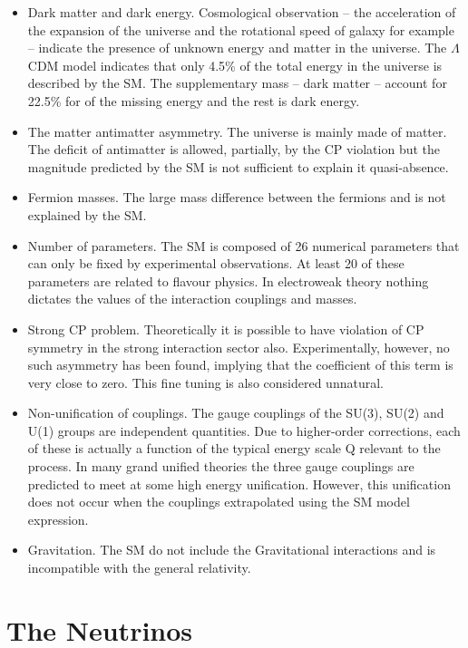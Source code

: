 \begin{itemize}
  \item Dark matter and dark energy. Cosmological observation -- the acceleration of the expansion of the universe and the rotational speed of galaxy for example -- indicate the presence of unknown energy and matter in the universe. The $\Lambda$CDM model \cite{bull_beyond_2016, perivolaropoulos_challenges_2022} indicates that only 4.5\% of the total energy in the universe is described by the SM. The supplementary mass -- dark matter -- account for 22.5\% for of the missing energy and the rest is dark energy.
  \item The matter antimatter asymmetry. The universe is mainly made of matter. The deficit of antimatter is allowed, partially, by the CP violation but the magnitude predicted by the SM is not sufficient to explain it quasi-absence.
  \item Fermion masses. The large mass difference between the fermions and is not explained by the SM.
  \item Number of parameters. The SM is composed of 26 numerical parameters that can only be fixed by experimental observations. At least 20 of these parameters are related to flavour physics. In electroweak theory nothing dictates the values of the interaction couplings and masses.
  \item Strong CP problem. Theoretically it is possible to have violation of CP symmetry in the strong interaction sector also. Experimentally, however, no such asymmetry has been found, implying that the coefficient of this term is very close to zero. This fine tuning is also considered unnatural.
  \item Non-unification of couplings. The gauge couplings of the SU(3), SU(2) and U(1) groups are independent quantities. Due to higher-order corrections, each of these is actually a function of the typical energy scale Q relevant to the process. In many grand unified theories the three gauge couplings are predicted to meet at some high energy unification. However, this unification does not occur when the couplings extrapolated using the SM model expression.
  \item Gravitation. The SM do not include the Gravitational interactions and is incompatible with the general relativity.
\end{itemize}


\section{The Neutrinos}
\label{sec:neutrino:th}

